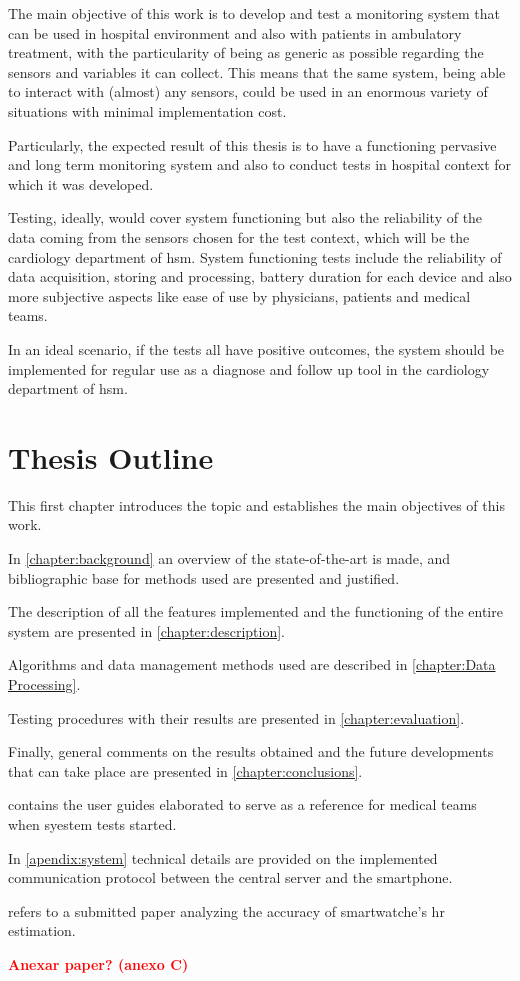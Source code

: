 The main objective of this work is to develop and test a monitoring system that can be used in hospital environment and also with patients in ambulatory treatment, with the particularity of being as generic as possible regarding the sensors and variables it can collect. This means that the same system, being able to interact with (almost) any sensors, could be used in an enormous variety of situations with minimal implementation cost.

Particularly, the expected result of this thesis is to have a functioning pervasive and long term monitoring system and also to conduct tests in hospital context for which it was developed.

Testing, ideally, would cover system functioning but also the reliability of the data coming from the sensors chosen for the test context, which will be the cardiology department of \ac{hsm}. System functioning tests include the reliability of data acquisition, storing and processing, battery duration for each device and also more subjective aspects like ease of use by physicians, patients and medical teams.

In an ideal scenario, if the tests all have positive outcomes, the system should be implemented for regular use as a diagnose and follow up tool in the cardiology department of \ac{hsm}.


\section{Thesis Outline}
\label{section:outline}

This first chapter introduces the topic and establishes the main objectives of this work.

In \cref{chapter:background} an overview of the state-of-the-art is made, and bibliographic base for methods used are presented and justified.

The description of all the features implemented and the functioning of the entire system are presented in \cref{chapter:description}.

Algorithms and data management methods used are described in \cref{chapter:Data Processing}.

Testing procedures with their results are presented in \cref{chapter:evaluation}.

Finally, general comments on the results obtained and the future developments that can take place are presented in \cref{chapter:conclusions}.

 contains the user guides elaborated to serve as a reference for medical teams when syestem tests started.

In \cref{apendix:system} technical details are provided on the implemented communication protocol between the central server and the smartphone.

 refers to a submitted paper analyzing the accuracy of smartwatche's \ac{hr} estimation.

\bigskip
\textcolor{red}{\Large \textbf{Anexar paper? (anexo C)}}
\bigskip

